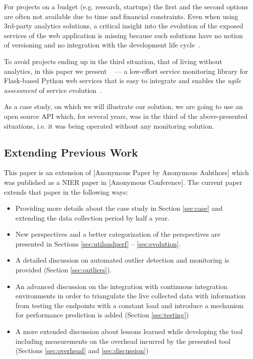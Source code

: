 
For projects on a budget (e.g. research, startups) the first and the second options are often not available due to time and financial constraints. Even when using 3rd-party analytics solutions, a critical insight into the evolution of the exposed services of the web application is missing because such solutions have no notion of versioning and no integration with the development life cycle~\cite{papazoglou2011managing}.

To avoid projects ending up in the third situation, that of living without analytics, in this paper we present \tool~ --- a low-effort service monitoring library for Flask-based Python web services that is easy to integrate and enables the {\em agile assessment} of service evolution~\cite{Nier12b}. 

As a case study, on which we will illustrate our solution, we are going to use an open source API which, for several years, was in the third of the above-presented situations, i.e. it was being operated without any monitoring solution.


\subsection*{Extending Previous Work}

This paper is an extension of [Anonymous Paper by Anonymous Auhthors] which was published as a NIER paper in [Anonymous Conference]. The current paper extends that paper in the following ways: 
\begin{itemize}
  \item Providing more details about the case study in Section \ref{sec:case} and extending the data collection period by half a year.
  \item New perspectives and a better categorization of the perspectives are presented in Sections \ref{sec:utilandperf} -- \ref{sec:evolution}.
  \item A detailed discussion on automated outlier detection and monitoring is provided (Section \ref{sec:outliers}).
  \item An advanced discussion on the integration with continuous integration environments in order to triangulate the live collected data with information from testing the endpoints with a constant load and introduce a mechanism for performance prediction is added (Section \ref{sec:testing})
  \item A more extended discussion about lessons learned while developing the tool including measurements on the overhead incurred by the presented tool (Sections \ref{sec:overhead} and \ref{sec:discussion})
\end{itemize}



